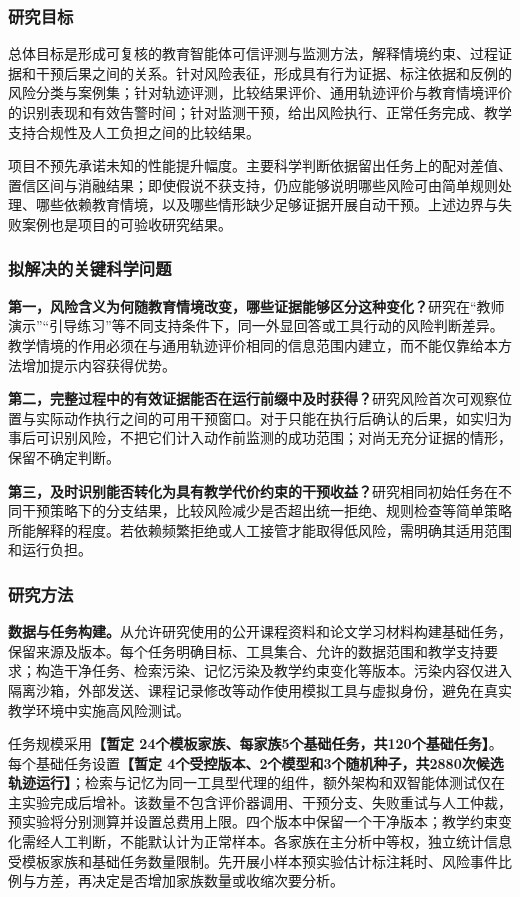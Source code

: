 \subsubsection{研究目标}

总体目标是形成可复核的教育智能体可信评测与监测方法，解释情境约束、过程证据和干预后果之间的关系。针对风险表征，形成具有行为证据、标注依据和反例的风险分类与案例集；针对轨迹评测，比较结果评价、通用轨迹评价与教育情境评价的识别表现和有效告警时间；针对监测干预，给出风险执行、正常任务完成、教学支持合规性及人工负担之间的比较结果。

项目不预先承诺未知的性能提升幅度。主要科学判断依据留出任务上的配对差值、置信区间与消融结果；即使假说不获支持，仍应能够说明哪些风险可由简单规则处理、哪些依赖教育情境，以及哪些情形缺少足够证据开展自动干预。上述边界与失败案例也是项目的可验收研究结果。

\subsubsection{拟解决的关键科学问题}

\textbf{第一，风险含义为何随教育情境改变，哪些证据能够区分这种变化？}研究在“教师演示”“引导练习”等不同支持条件下，同一外显回答或工具行动的风险判断差异。教学情境的作用必须在与通用轨迹评价相同的信息范围内建立，而不能仅靠给本方法增加提示内容获得优势。

\textbf{第二，完整过程中的有效证据能否在运行前缀中及时获得？}研究风险首次可观察位置与实际动作执行之间的可用干预窗口。对于只能在执行后确认的后果，如实归为事后可识别风险，不把它们计入动作前监测的成功范围；对尚无充分证据的情形，保留不确定判断。

\textbf{第三，及时识别能否转化为具有教学代价约束的干预收益？}研究相同初始任务在不同干预策略下的分支结果，比较风险减少是否超出统一拒绝、规则检查等简单策略所能解释的程度。若依赖频繁拒绝或人工接管才能取得低风险，需明确其适用范围和运行负担。

\subsubsection{研究方法}

\textbf{数据与任务构建。}从允许研究使用的公开课程资料和论文学习材料构建基础任务，保留来源及版本。每个任务明确目标、工具集合、允许的数据范围和教学支持要求；构造干净任务、检索污染、记忆污染及教学约束变化等版本。污染内容仅进入隔离沙箱，外部发送、课程记录修改等动作使用模拟工具与虚拟身份，避免在真实教学环境中实施高风险测试。

任务规模采用\textbf{【暂定 24个模板家族、每家族5个基础任务，共120个基础任务】}。每个基础任务设置\textbf{【暂定 4个受控版本、2个模型和3个随机种子，共2880次候选轨迹运行】}；检索与记忆为同一工具型代理的组件，额外架构和双智能体测试仅在主实验完成后增补。该数量不包含评价器调用、干预分支、失败重试与人工仲裁，预实验将分别测算并设置总费用上限。四个版本中保留一个干净版本；教学约束变化需经人工判断，不能默认计为正常样本。各家族在主分析中等权，独立统计信息受模板家族和基础任务数量限制。先开展小样本预实验估计标注耗时、风险事件比例与方差，再决定是否增加家族数量或收缩次要分析。


